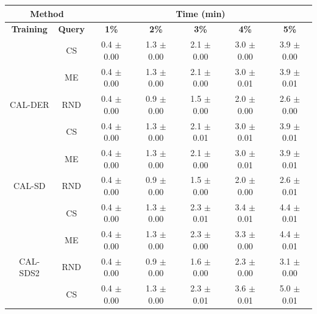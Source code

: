 \begin{table}[htbp]
\centering

\begin{tabular*}{\linewidth}{c|c|@{\extracolsep{\fill}}ccccc}
\toprule
\multicolumn{2}{c|}{\textbf{Method}} & \multicolumn{5}{c}{\textbf{Time (min)}} \\
\midrule
\textbf{Training} & \textbf{Query} & \textbf{1\%} & \textbf{2\%} & \textbf{3\%} & \textbf{4\%} & \textbf{5\%}\\
\midrule
 & CS & 0.4 $\pm$ {\small 0.00} & 1.3 $\pm$ {\small 0.00} & 2.1 $\pm$ {\small 0.00} & 3.0 $\pm$ {\small 0.00} & 3.9 $\pm$ {\small 0.00}\\

 & ME & 0.4 $\pm$ {\small 0.00} & 1.3 $\pm$ {\small 0.00} & 2.1 $\pm$ {\small 0.00} & 3.0 $\pm$ {\small 0.01} & 3.9 $\pm$ {\small 0.01}\\

\multirow{-3}{*}{\raggedright\arraybackslash CAL-DER} & RND & 0.4 $\pm$ {\small 0.00} & 0.9 $\pm$ {\small 0.00} & 1.5 $\pm$ {\small 0.00} & 2.0 $\pm$ {\small 0.00} & 2.6 $\pm$ {\small 0.00}\\
\midrule
 & CS & 0.4 $\pm$ {\small 0.00} & 1.3 $\pm$ {\small 0.00} & 2.1 $\pm$ {\small 0.01} & 3.0 $\pm$ {\small 0.01} & 3.9 $\pm$ {\small 0.01}\\

 & ME & 0.4 $\pm$ {\small 0.00} & 1.3 $\pm$ {\small 0.00} & 2.1 $\pm$ {\small 0.00} & 3.0 $\pm$ {\small 0.01} & 3.9 $\pm$ {\small 0.01}\\

\multirow{-3}{*}{\raggedright\arraybackslash CAL-SD} & RND & 0.4 $\pm$ {\small 0.00} & 0.9 $\pm$ {\small 0.00} & 1.5 $\pm$ {\small 0.00} & 2.0 $\pm$ {\small 0.00} & 2.6 $\pm$ {\small 0.01}\\
\midrule
 & CS & 0.4 $\pm$ {\small 0.00} & 1.3 $\pm$ {\small 0.00} & 2.3 $\pm$ {\small 0.01} & 3.4 $\pm$ {\small 0.01} & 4.4 $\pm$ {\small 0.01}\\

 & ME & 0.4 $\pm$ {\small 0.00} & 1.3 $\pm$ {\small 0.00} & 2.3 $\pm$ {\small 0.00} & 3.3 $\pm$ {\small 0.00} & 4.4 $\pm$ {\small 0.01}\\

\multirow{-3}{*}{\raggedright\arraybackslash CAL-SDS2} & RND & 0.4 $\pm$ {\small 0.00} & 0.9 $\pm$ {\small 0.00} & 1.6 $\pm$ {\small 0.00} & 2.3 $\pm$ {\small 0.00} & 3.1 $\pm$ {\small 0.00}\\
\midrule
 & CS & 0.4 $\pm$ {\small 0.00} & 1.3 $\pm$ {\small 0.00} & 2.3 $\pm$ {\small 0.01} & 3.6 $\pm$ {\small 0.01} & 5.0 $\pm$ {\small 0.01}\\


\end{tabular*}
\end{table}
